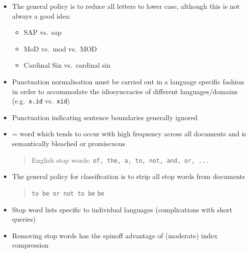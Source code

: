 \documentclass[a4paper,landscape,headrule,footrule,xetex]{foils}
\begin{document}


\begin{itemize}
\item The general policy is to reduce all letters to lower case,
  although this is not always a good idea:
  \begin{itemize}
  \item SAP vs.\ sap
  \item MoD vs.\ mod vs.\ MOD
  \item Cardinal Sin vs.\ cardinal sin
  \end{itemize}
\item Punctuation normalisation must be carried out in a language
  specific fashion in order to accommodate the idiosyncracies of
  different languages/domains (e.g.\ \texttt{x.id} vs.\ \texttt{xid})
\item Punctuation indicating sentence boundaries generally ignored
\end{itemize}










\begin{itemize}
\item {} = word which tends to occur with high frequency
  across all documents and is semantically bleached or promiscuous
  \begin{quote}
    English stop words: \texttt{of, the, a, to, not, and, or, ...}
  \end{quote}
\item The general policy for classification is to strip all stop words from documents
  \begin{quote}
    \texttt{to be or not to be} \infers \texttt{be}
  \end{quote}
\item Stop word lists specific to individual languages (complications with short queries)
\item Removing stop words has the spinoff advantage of (moderate) index compression
\end{itemize}





\end{document}
